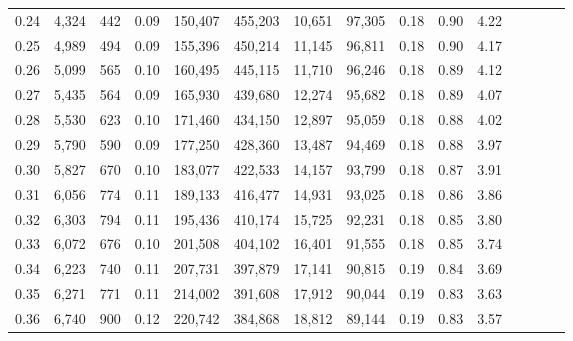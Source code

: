 \begin{tabular}{rrrcrrrrrrrrrrr}
0.24 &   4,324 &     442 &                                       0.09 &  150,407 &  455,203 &   10,651 &   97,305 &  0.18 &  0.90 &                         4.22 \\
0.25 &   4,989 &     494 &                                       0.09 &  155,396 &  450,214 &   11,145 &   96,811 &  0.18 &  0.90 &                         4.17 \\
0.26 &   5,099 &     565 &                                       0.10 &  160,495 &  445,115 &   11,710 &   96,246 &  0.18 &  0.89 &                         4.12 \\
0.27 &   5,435 &     564 &                                       0.09 &  165,930 &  439,680 &   12,274 &   95,682 &  0.18 &  0.89 &                         4.07 \\
0.28 &   5,530 &     623 &                                       0.10 &  171,460 &  434,150 &   12,897 &   95,059 &  0.18 &  0.88 &                         4.02 \\
0.29 &   5,790 &     590 &                                       0.09 &  177,250 &  428,360 &   13,487 &   94,469 &  0.18 &  0.88 &                         3.97 \\
0.30 &   5,827 &     670 &                                       0.10 &  183,077 &  422,533 &   14,157 &   93,799 &  0.18 &  0.87 &                         3.91 \\
0.31 &   6,056 &     774 &                                       0.11 &  189,133 &  416,477 &   14,931 &   93,025 &  0.18 &  0.86 &                         3.86 \\
0.32 &   6,303 &     794 &                                       0.11 &  195,436 &  410,174 &   15,725 &   92,231 &  0.18 &  0.85 &                         3.80 \\
0.33 &   6,072 &     676 &                                       0.10 &  201,508 &  404,102 &   16,401 &   91,555 &  0.18 &  0.85 &                         3.74 \\
0.34 &   6,223 &     740 &                                       0.11 &  207,731 &  397,879 &   17,141 &   90,815 &  0.19 &  0.84 &                         3.69 \\
0.35 &   6,271 &     771 &                                       0.11 &  214,002 &  391,608 &   17,912 &   90,044 &  0.19 &  0.83 &                         3.63 \\
0.36 &   6,740 &     900 &                                       0.12 &  220,742 &  384,868 &   18,812 &   89,144 &  0.19 &  0.83 &                         3.57 \\

\end{tabular}
